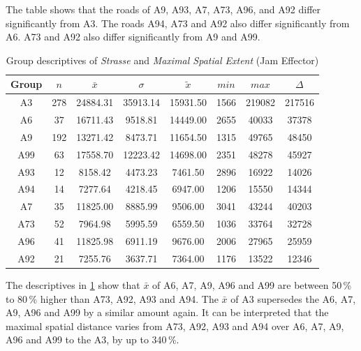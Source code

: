 The table shows that the roads of A9, A93, A7, A73, A96, and A92 differ significantly from A3. The roads A94, A73 and A92 also differ significantly from A6. A73 and A92 also differ significantly from A9 and A99.
\begin{table}[ht]
	\tiny
	\centering
	\begin{tabular}{c|c|c|c|c|c|c|c}
		\toprule
		Group & $n$ & $\bar{x}$ & $\sigma$ & $\tilde{x}$ & $min$ & $max$ & $\Delta$ \\
		\midrule
		A3   & 278 & 24884.31 & 35913.14 & 15931.50 & 1566 & 219082 & 217516 \\ 
		A6   & 37  & 16711.43 & 9518.81  & 14449.00 & 2655 & 40033  & 37378 \\ 
		A9   & 192 & 13271.42 & 8473.71  & 11654.50 & 1315 & 49765  & 48450 \\ 
		A99  & 63  & 17558.70 & 12223.42 & 14698.00 & 2351 & 48278  & 45927 \\ 
		A93  & 12  & 8158.42  & 4473.23  & 7461.50  & 2896 & 16922  & 14026 \\ 
		A94  & 14  & 7277.64  & 4218.45  & 6947.00  & 1206 & 15550  & 14344 \\ 
		A7   & 35  & 11825.00 & 8885.99  & 9506.00  & 3041 & 43244  & 40203 \\ 
		A73  & 52  & 7964.98  & 5995.59  & 6559.50  & 1036 & 33764  & 32728 \\ 
		A96  & 41  & 11825.98 & 6911.19  & 9676.00  & 2006 & 27965  & 25959 \\ 
		A92  & 21  & 7255.76  & 3637.71  & 7364.00  & 1176 & 13522  & 12346 \\ 
		\bottomrule
	  \end{tabular}
    \caption{Group descriptives of \textit{Strasse} and \textit{Maximal Spatial Extent} (Jam Effector)}
    \label{tbl:descriptives_baysis_effector_Strasse_SMax}
\end{table}
The descriptives in \cref{tbl:descriptives_baysis_effector_Strasse_SMax} show that $\bar{x}$ of A6, A7, A9, A96 and A99 are between 50\,\% to 80\,\% higher than A73, A92, A93 and A94. The $\bar{x}$ of A3 supersedes the A6, A7, A9, A96 and A99 by a similar amount again. It can be interpreted that the maximal spatial distance varies from A73, A92, A93 and A94 over A6, A7, A9, A96 and A99 to the A3, by up to 340\,\%.

